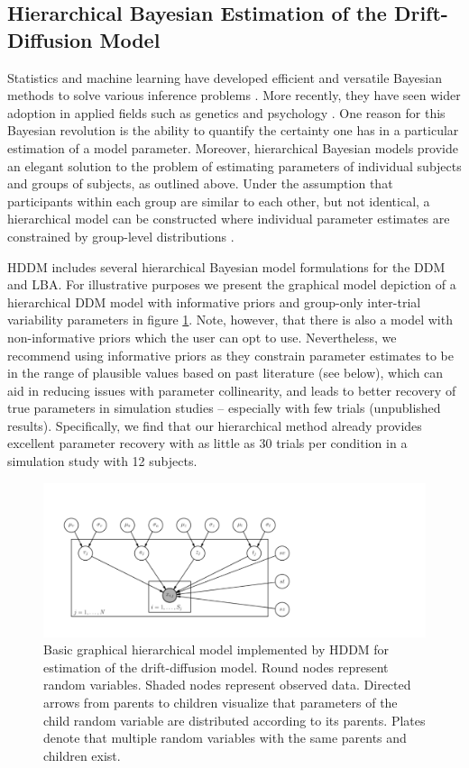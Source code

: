 \documentclass[letterpaper,10pt,english]{article}
\begin{document}
\subsection*{Hierarchical Bayesian Estimation of the Drift-Diffusion
Model}
\label{methods:hierarchical-bayesian-estimation}
Statistics and machine learning have developed efficient and versatile
Bayesian methods to solve various inference problems
\citep{Poirier06}. More recently, they have seen wider adoption in
applied fields such as genetics \citep{StephensBalding09} and
psychology \citep{ClemensDeSelenEtAl11}. One reason for this Bayesian
revolution is the ability to quantify the certainty one has in a
particular estimation of a model parameter. Moreover, hierarchical
Bayesian models provide an elegant solution to the problem of
estimating parameters of individual subjects and groups of subjects,
as outlined above. Under the assumption that participants within each
group are similar to each other, but not identical, a hierarchical
model can be constructed where individual parameter estimates are
constrained by group-level distributions
\citep{NilssonRieskampWagenmakers11,ShiffrinLeeKim08}.

HDDM includes several hierarchical Bayesian model formulations for the
DDM and LBA. For illustrative purposes we present the graphical model
depiction of a hierarchical DDM model with informative priors and
group-only inter-trial variability parameters in figure
\ref{fig.graphical}. Note, however, that
there is also a model with non-informative priors which the user can
opt to use. Nevertheless, we recommend using informative priors as
they constrain parameter estimates to be in the range of plausible
values based on past literature (see below), which can aid in reducing
issues with parameter collinearity, and leads to better recovery of
true parameters in simulation studies -- especially with few trials
(unpublished results). Specifically, we find that our hierarchical
method already provides excellent parameter recovery with as little as
30 trials per condition in a simulation study with 12 subjects.

\begin{figure}
\centering
\includegraphics[scale=.6]{graphical_hddm.pdf}
\caption{Basic graphical hierarchical model implemented by HDDM for
estimation of the drift-diffusion model. Round nodes represent random
variables. Shaded nodes represent observed data. Directed arrows from
parents to children visualize that parameters of the child random
variable are distributed according to its   parents. Plates denote
that multiple random variables with the same   parents and children
exist.}
\label{fig.graphical}
\end{figure}
\end{document}
